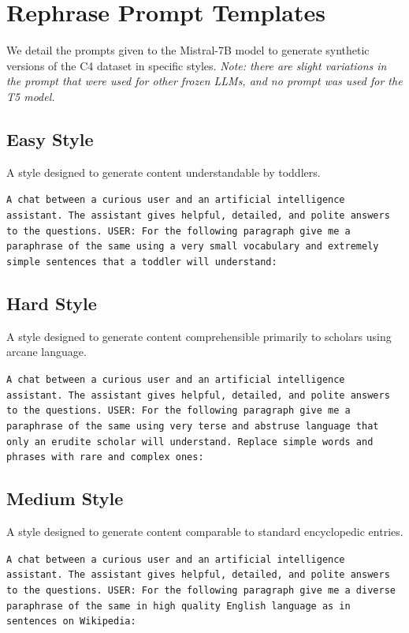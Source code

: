 \clearpage

\section{Rephrase Prompt Templates}
\label{app:prompt_styles}
We detail the prompts given to the Mistral-7B model to generate synthetic versions of the C4 dataset in specific styles.  \emph{Note: there are slight variations in the prompt that were used for other frozen LLMs, and no prompt was used for the T5 model.}

\subsection*{Easy Style}
A style designed to generate content understandable by toddlers.
\begin{tcolorbox}[colback=gray!20, colframe=gray!75, rounded corners, sharp corners=northeast, sharp corners=southwest]
\texttt{A chat between a curious user and an artificial intelligence assistant. The assistant gives helpful, detailed, and polite answers to the questions. USER: For the following paragraph give me a paraphrase of the same using a very small vocabulary and extremely simple sentences that a toddler will understand:}
\end{tcolorbox}

\subsection*{Hard Style}
A style designed to generate content comprehensible primarily to scholars using arcane language.
\begin{tcolorbox}[colback=gray!20, colframe=gray!75, rounded corners, sharp corners=northeast, sharp corners=southwest]
\texttt{A chat between a curious user and an artificial intelligence assistant. The assistant gives helpful, detailed, and polite answers to the questions. USER: For the following paragraph give me a paraphrase of the same using very terse and abstruse language that only an erudite scholar will understand. Replace simple words and phrases with rare and complex ones:}
\end{tcolorbox}

\subsection*{Medium Style}
A style designed to generate content comparable to standard encyclopedic entries.
\begin{tcolorbox}[colback=gray!20, colframe=gray!75, rounded corners, sharp corners=northeast, sharp corners=southwest]
\texttt{A chat between a curious user and an artificial intelligence assistant. The assistant gives helpful, detailed, and polite answers to the questions. USER: For the following paragraph give me a diverse paraphrase of the same in high quality English language as in sentences on Wikipedia:}
\end{tcolorbox}

